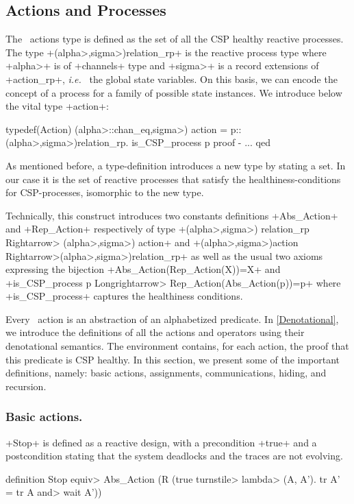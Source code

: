 \documentclass[11pt,a4paper]{article}
\newcommand{\ie}{\textit{i.e.}\ }
\begin{document}
\subsection{Actions and Processes}
\label{ActionsAndP}
The \Circus\ actions type is defined as the set of all the CSP healthy reactive processes. 
The type \inlineisar+(\<alpha>,\<sigma>)relation_rp+ is the reactive process type where 
\inlineisar+\<alpha>+ is of \inlineisar+channels+ type and 
\inlineisar+\<sigma>+ is a record extensions of \inlineisar+action_rp+, \ie{} the global state variables.
On this basis, we can encode the concept of a process for a family of possible state instances.
We introduce below the vital type \inlineisar+action+:
\begin{isar}
typedef(Action)
 (\<alpha>::chan_eq,\<sigma>) action = {p::(\<alpha>,\<sigma>)relation_rp. is_CSP_process p}
proof - {...} 
qed
\end{isar}
As mentioned before, a type-definition introduces a new type by stating a set. In our case it is the set
of reactive processes that satisfy the healthiness-conditions for CSP-processes, isomorphic to the new type.

Technically, this %
construct introduces two constants definitions \inlineisar+Abs_Action+ and \inlineisar+Rep_Action+ 
respectively of type  \inlineisar+(\<alpha>,\<sigma>) relation_rp \<Rightarrow> (\<alpha>,\<sigma>) action+ and
\inlineisar+(\<alpha>,\<sigma>)action \<Rightarrow>(\<alpha>,\<sigma>)relation_rp+ as well as the
usual two axioms expressing the bijection \inlineisar+Abs_Action(Rep_Action(X))=X+ and 
\inlineisar+is_CSP_process p \<Longrightarrow> Rep_Action(Abs_Action(p))=p+ where
\inlineisar+is_CSP_process+ captures the healthiness conditions. 

Every \Circus\ action is an abstraction of an alphabetized predicate. In \ref{Denotational}, we 
introduce the definitions of all the actions  and operators using their denotational semantics. 
The environment contains, for each action, the proof that this predicate  is CSP healthy.
In this section, we present some of the important definitions, namely: basic actions, assignments, 
communications, hiding, and recursion.

\subsubsection{Basic actions.}
\inlineisar+Stop+ is defined as a reactive design, with a precondition \inlineisar+true+ and
a postcondition stating that the system deadlocks and the traces are 
not evolving.
\begin{isar}
definition 
Stop \<equiv>   Abs_Action (R (true \<turnstile> \<lambda> (A, A'). tr A' = tr A \<and>    wait A'))
\end{isar}
\end{document}
